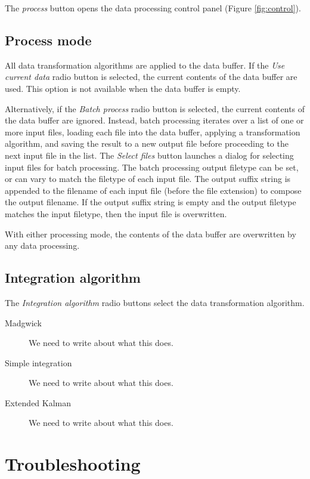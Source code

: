 \documentclass[11pt,letterpaper,article,oneside]{memoir}
\begin{document}
The \emph{process} button opens the data processing control panel (Figure
\ref{fig:control}).

\section{Process mode}
All data transformation algorithms are applied to the data buffer. If the \emph{Use
current data} radio button is selected, the current contents of the data buffer
are used. This option is not available when the data buffer is empty.

Alternatively, if the \emph{Batch process} radio button is selected, the current
contents of the data buffer are ignored. Instead, batch processing iterates over
a list of one or more input files, loading each file into the data buffer,
applying a transformation algorithm, and saving the result to a new output file
before proceeding to the next input file in the list. The \emph{Select files}
button launches a dialog for selecting input files for batch processing.  The
batch processing output filetype can be set, or can vary to match the filetype
of each input file. The output suffix string is appended to the filename of each
input file (before the file extension) to compose the output filename. If the
output suffix string is empty and the output filetype matches the input
filetype, then the input file is overwritten.

With either processing mode, the contents of the data buffer are overwritten by
any data processing.

\section{Integration algorithm}

The \emph{Integration algorithm} radio buttons select the data transformation
algorithm.

\begin{description}

\item[Madgwick]
We need to write about what this does.
\item[Simple integration]
We need to write about what this does.
\item[Extended Kalman]
We need to write about what this does.

\end{description}





\chapter{Troubleshooting}
\end{document}
